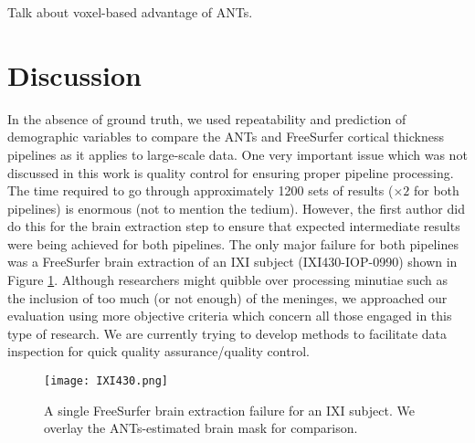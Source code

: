 
Talk about voxel-based advantage of ANTs.





\section{Discussion}
In the absence of ground truth, we used repeatability and prediction of
demographic variables to compare the ANTs and FreeSurfer cortical 
thickness pipelines as it applies to large-scale data.  One very important
issue which was not discussed in this work is quality control for 
ensuring proper pipeline processing.  The time required to go through 
approximately 1200 sets of results ($\times 2$ for both pipelines) is
enormous (not to mention the tedium).  However, the first
author did do this for the brain extraction step to ensure that expected
intermediate results were being achieved for both pipelines.  The only 
major failure for both pipelines was a FreeSurfer brain extraction of
an IXI subject (IXI430-IOP-0990) shown in Figure \ref{fig:ixi430}. 
Although  researchers might quibble over processing minutiae such as the 
inclusion of too much (or not enough) of the meninges, we approached
our evaluation using more objective criteria which concern all those
engaged in this type of research.  We are currently trying to develop methods
to facilitate data inspection for quick quality assurance/quality control.

\begin{figure}[htb]
\texttt{[image: IXI430.png]}
\caption{A single FreeSurfer brain extraction failure for an IXI subject.  We 
         overlay the ANTs-estimated brain mask for comparison.}
\label{fig:ixi430}
\end{figure}

